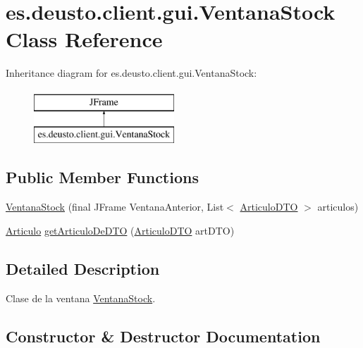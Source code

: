 \hypertarget{classes_1_1deusto_1_1client_1_1gui_1_1_ventana_stock}{}\section{es.\+deusto.\+client.\+gui.\+Ventana\+Stock Class Reference}
\label{classes_1_1deusto_1_1client_1_1gui_1_1_ventana_stock}
Inheritance diagram for es.\+deusto.\+client.\+gui.\+Ventana\+Stock\+:\begin{figure}[H]
\begin{center}
\leavevmode
\includegraphics[height=2.000000cm]{classes_1_1deusto_1_1client_1_1gui_1_1_ventana_stock}
\end{center}
\end{figure}
\subsection*{Public Member Functions}
\begin{DoxyCompactItemize}
\item 
\mbox{\hyperlink{classes_1_1deusto_1_1client_1_1gui_1_1_ventana_stock_ae0f7ffdf7a1ee395ad344351a24d404d}{Ventana\+Stock}} (final J\+Frame Ventana\+Anterior, List$<$ \mbox{\hyperlink{classes_1_1deusto_1_1server_1_1dto_1_1_articulo_d_t_o}{Articulo\+D\+TO}} $>$ articulos)
\item 
\mbox{\hyperlink{classes_1_1deusto_1_1client_1_1data_1_1_articulo}{Articulo}} \mbox{\hyperlink{classes_1_1deusto_1_1client_1_1gui_1_1_ventana_stock_aa2b5f90e0304767e85bc53b4b6b9fac5}{get\+Articulo\+De\+D\+TO}} (\mbox{\hyperlink{classes_1_1deusto_1_1server_1_1dto_1_1_articulo_d_t_o}{Articulo\+D\+TO}} art\+D\+TO)
\end{DoxyCompactItemize}


\subsection{Detailed Description}
Clase de la ventana \mbox{\hyperlink{classes_1_1deusto_1_1client_1_1gui_1_1_ventana_stock}{Ventana\+Stock}}. 

\subsection{Constructor \& Destructor Documentation}
\mbox{\label{classes_1_1deusto_1_1client_1_1gui_1_1_ventana_stock_ae0f7ffdf7a1ee395ad344351a24d404d}} 
